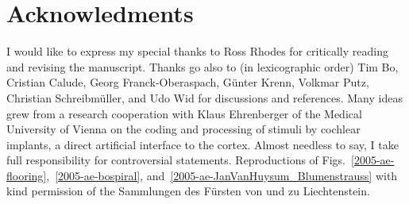 \documentclass[rmp,amssymb,showpacs,showkeys,12pt,preprint]{revtex4}
\begin{document}
\section*{Acknowledments}
I would like to express my special thanks to Ross Rhodes
for critically reading and revising the manuscript.
Thanks go also to (in lexicographic order)
Tim Bo,
Cristian Calude,
Georg Franck-Oberaspach,
G\"unter Krenn,
Volkmar Putz,
Christian Schreibm\"uller,
and
Udo Wid
for discussions and references.
Many ideas grew from a research cooperation with Klaus Ehrenberger
of the Medical University of Vienna on the coding and processing of
stimuli by cochlear implants, a direct artificial interface to the cortex.
Almost needless to say,
I take full responsibility for controversial statements.
Reproductions of Figs.~\ref{2005-ae-flooring},~\ref{2005-ae-bospiral}, and~\ref{2005-ae-JanVanHuysum_Blumenstrauss}
with kind permission of the Sammlungen des F\"ursten von und zu Liechtenstein.

%
%
\end{document}
